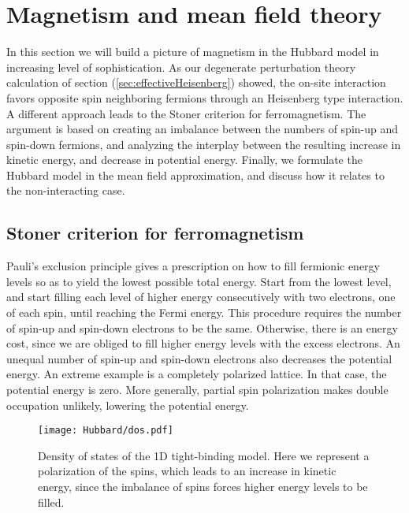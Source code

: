 \section{Magnetism and mean field theory}\label{sec:magMFT}

In this section we will build a picture of magnetism in the Hubbard model in increasing level of sophistication.
As our degenerate perturbation theory  calculation of section (\ref{sec:effectiveHeisenberg}) showed, the on-site interaction favors opposite spin neighboring fermions through an Heisenberg type interaction.
A different approach leads to the Stoner criterion for ferromagnetism.
The argument is based on creating an imbalance between the numbers of spin-up and spin-down fermions, and analyzing the interplay between the resulting increase in kinetic energy, and decrease in potential energy.
Finally, we formulate the Hubbard model in the mean field approximation, and discuss how it relates to the non-interacting case.

\subsection{Stoner criterion for ferromagnetism}
\label{subsec:stoner}

Pauli's exclusion principle gives a prescription on how to fill fermionic energy levels so as to yield the lowest possible total energy.
Start from the lowest level, and start filling each level of higher energy consecutively with two electrons, one of each spin, until reaching the Fermi energy.
This procedure requires the number of spin-up and spin-down electrons to be the same.
Otherwise, there is an energy cost, since we are obliged to fill higher energy levels with the excess electrons.
An unequal number of spin-up and spin-down electrons also decreases the potential energy.
An extreme example is a completely polarized lattice.
In that case, the potential energy is zero.
More generally, partial spin polarization makes double occupation unlikely, lowering the potential energy.
\vspace{-0.3cm}
\begin{figure}[H]
	\centering
\hspace{2mm}\texttt{[image: Hubbard/dos.pdf]}
	\caption[Density of states of the \acs{1D} tight-binding model.]{Density of states of the \acs{1D} tight-binding model.
	Here we represent a polarization of the spins, which leads to an increase in kinetic energy, since the imbalance of spins forces higher energy levels to be filled.}
	\label{fig:dos}
\end{figure}

